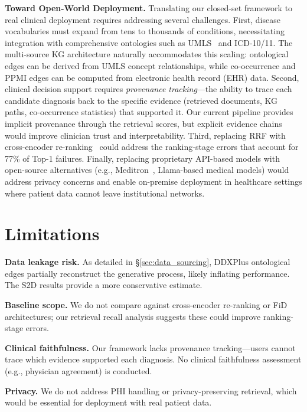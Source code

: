\documentclass[runningheads]{llncs}
\begin{document}
\textbf{Toward Open-World Deployment.}
Translating our closed-set framework to real clinical deployment requires addressing several challenges. First, disease vocabularies must expand from tens to thousands of conditions, necessitating integration with comprehensive ontologies such as UMLS~\cite{bodenreider2004unified} and ICD-10/11. The multi-source KG architecture naturally accommodates this scaling: ontological edges can be derived from UMLS concept relationships, while co-occurrence and PPMI edges can be computed from electronic health record (EHR) data. Second, clinical decision support requires \emph{provenance tracking}---the ability to trace each candidate diagnosis back to the specific evidence (retrieved documents, KG paths, co-occurrence statistics) that supported it. Our current pipeline provides implicit provenance through the retrieval scores, but explicit evidence chains would improve clinician trust and interpretability. Third, replacing RRF with cross-encoder re-ranking~\cite{nogueira2020passage} could address the ranking-stage errors that account for 77\% of Top-1 failures. Finally, replacing proprietary API-based models with open-source alternatives (e.g., Meditron~\cite{chen2023meditron}, Llama-based medical models) would address privacy concerns and enable on-premise deployment in healthcare settings where patient data cannot leave institutional networks.

\section{Limitations}
\label{sec:limitations}

\textbf{Data leakage risk.} As detailed in \S\ref{sec:data_sourcing}, DDXPlus ontological edges partially reconstruct the generative process, likely inflating performance. The S2D results provide a more conservative estimate.

\textbf{Baseline scope.} We do not compare against cross-encoder re-ranking or FiD architectures; our retrieval recall analysis suggests these could improve ranking-stage errors.

\textbf{Clinical faithfulness.} Our framework lacks provenance tracking---users cannot trace which evidence supported each diagnosis. No clinical faithfulness assessment (e.g., physician agreement) is conducted.

\textbf{Privacy.} We do not address PHI handling or privacy-preserving retrieval, which would be essential for deployment with real patient data.
\end{document}
